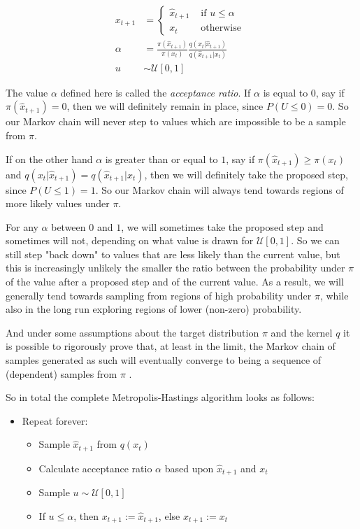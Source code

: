 \begin{align*}
x_{t+1} & = \begin{cases}
    \hat{x}_{t+1} & \text{ if } u \le \alpha \\
            x_{t} & \text{ otherwise }
            \end{cases} \\
\alpha & = \frac{\pi(\hat{x}_{t+1})}{\pi(x_t)} \frac{q(x_t | \hat{x}_{t+1})}{q(\hat{x}_{t+1} | x_t)} \\
u & \sim \mathcal{U}[0,1]
\end{align*}

The value $\alpha$ defined here is called the \textit{acceptance ratio}. If $\alpha$ is equal to $0$, say if $\pi(\hat{x}_{t+1}) = 0$, then we will definitely remain in place, since $P(U \le 0) = 0$. So our Markov chain will never step to values which are impossible to be a sample from $\pi$.

If on the other hand $\alpha$ is greater than or equal to $1$, say if $\pi(\hat{x}_{t+1}) \ge {\pi(x_t)}$ and $q(x_t | \hat{x}_{t+1}) = q(\hat{x}_{t+1} | x_t)$, then we will definitely take the proposed step, since $P(U \le 1) = 1$. So our Markov chain will always tend towards regions of more likely values under $\pi$.

For any $\alpha$ between $0$ and $1$, we will sometimes take the proposed step and sometimes will not, depending on what value is drawn for $\mathcal{U}[0,1]$. So we can still step "back down" to values that are less likely than the current value, but this is increasingly unlikely the smaller the ratio between the probability under $\pi$ of the value after a proposed step and of the current value. As a result, we will generally tend towards sampling from regions of high probability under $\pi$, while also in the long run exploring regions of lower (non-zero) probability.

And under some assumptions about the target distribution $\pi$ and the kernel $q$ it is possible to rigorously prove that, at least in the limit, the Markov chain of samples generated as such will eventually converge to being a sequence of (dependent) samples from $\pi$ \cite{metropolis1953equation}.

So in total the complete Metropolis-Hastings algorithm looks as follows:

\begin{minipage}{\linewidth}
\begin{itemize}
\item Repeat forever:
  \begin{itemize}
  \item Sample $\hat{x}_{t+1}$ from $q(x_t)$
  \item Calculate acceptance ratio $\alpha$ based upon $\hat{x}_{t+1}$ and $x_t$
  \item Sample $u \sim \mathcal{U}[0,1]$
  \item If $u \le \alpha$, then $x_{t+1} := \hat{x}_{t+1}$, else $x_{t+1} := x_t$
  \end{itemize}
\end{itemize}
\end{minipage}

